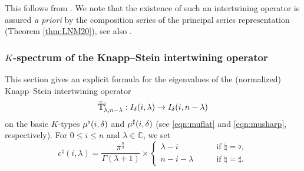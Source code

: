 This follows from \cite[Thm.~12.2]{KKP}.  
We note that the existence
 of such an intertwining operator is assured
 {\it{a priori}} by the composition series
 of the principal series representation
 (Theorem \ref{thm:LNM20}), 
 see also \cite{C}.  


\subsubsection{$K$-spectrum
 of the Knapp--Stein intertwining operator}
\label{subsec:KSspec}

This section gives an explicit formula for the eigenvalues
 of the (normalized) Knapp--Stein intertwining operator
\begin{equation}
\label{eqn:KSii}
\widetilde{{\mathbb{T}}}_{{\lambda},{n-\lambda}}^{{i}} :I_{\delta}(i,\lambda) \to I_{\delta}(i,n-\lambda)
\end{equation}
 on the basic $K$-types
 $\mu^{\flat}(i,\delta)$
 and $\mu^{\sharp}(i,\delta)$
 (see \eqref{eqn:muflat} and \eqref{eqn:musharp}, 
respectively).  
For $0 \le i \le n$ and $\lambda \in {\mathbb{C}}$, 
 we set 
\begin{equation}
\label{eqn:specT}
  c^{\natural}(i,\lambda)
  =
  \frac{\pi^{\frac n2}}{\Gamma(\lambda+1)}
  \times
  \begin{cases}
  \lambda-i
  \qquad
  &\text{if $\natural = \flat$}, 
\\
  n-i-\lambda
  \qquad
  &\text{if $\natural = \sharp$}.  
  \end{cases}
\end{equation}

